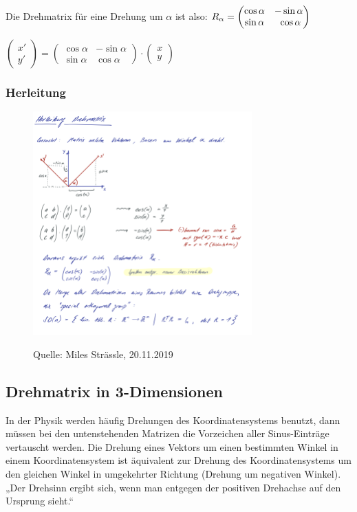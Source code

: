 Die Drehmatrix für eine Drehung um $\alpha$ ist also:  \newline
$R_\alpha = \begin{pmatrix} \cos\alpha & -\sin\alpha \\ \sin\alpha & \newline \cos\alpha\end{pmatrix}$

 $\begin{pmatrix} x' \\ y' \end{pmatrix} = \begin{pmatrix} \cos\alpha & -\sin\alpha \\ \sin\alpha & \cos\alpha\end{pmatrix} \cdot \begin{pmatrix} x \\y \end{pmatrix}$\\

\subsubsection{Herleitung}
\begin{figure}[H] 
\centering
    {\includegraphics[width=0.75\textwidth]{images/herldrehmat.png}}
    \caption{Quelle: Miles Strässle, 20.11.2019}    
\end{figure}

\subsection{Drehmatrix in 3-Dimensionen}
In der Physik werden häufig Drehungen des Koordinatensystems benutzt, dann müssen bei den untenstehenden Matrizen die Vorzeichen aller Sinus-Einträge vertauscht werden. Die Drehung eines Vektors um einen bestimmten Winkel in einem Koordinatensystem ist äquivalent zur Drehung des Koordinatensystems um den gleichen Winkel in umgekehrter Richtung (Drehung um negativen Winkel). 
\vspace{0.5cm}
„Der Drehsinn ergibt sich, wenn man entgegen der positiven Drehachse auf den Ursprung sieht.“

